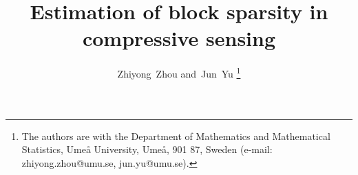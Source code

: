 \documentclass[journal,onecolumn]{IEEEtran}
\begin{document}
%
\title{Estimation of block sparsity in \\ compressive sensing}
%
%
%

\author{Zhiyong~Zhou %
        and~Jun~Yu %
\thanks{The authors are with the Department
of Mathematics and Mathematical Statistics, Ume{\aa} University,  Ume{\aa},
901 87, Sweden (e-mail: zhiyong.zhou@umu.se, jun.yu@umu.se).}}%

%
%



%
\end{document}
